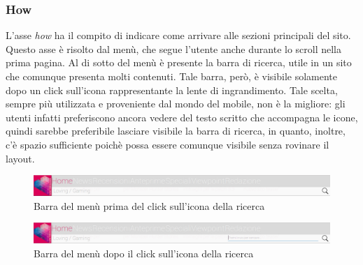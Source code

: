 \documentclass[../ProgettoTecWeb2.tex]{subfiles}
\begin{document}
		\subsubsection{How}
			L'asse \textit{how} ha il compito di indicare come arrivare alle sezioni principali del sito. Questo asse è risolto dal menù, che segue l'utente anche durante lo scroll nella prima pagina. Al di sotto del menù è presente la barra di ricerca, utile in un sito che comunque presenta molti contenuti. Tale barra, però, è visibile solamente dopo un click sull'icona rappresentante la lente di ingrandimento. Tale scelta, sempre più utilizzata e proveniente dal mondo del mobile, non è la migliore: gli utenti infatti preferiscono ancora vedere del testo scritto che accompagna le icone, quindi sarebbe preferibile lasciare visibile la barra di ricerca, in quanto, inoltre, c'è spazio sufficiente poichè possa essere comunque visibile senza rovinare il layout.
			\begin{figure} [H]
				\centering
				\includegraphics[scale=0.3]{img/BarraMenuILoveVg}
				\caption{Barra del menù prima del click sull'icona della ricerca}
			\end{figure}
			\begin{figure} [H]
				\centering
				\includegraphics[scale=0.3]{img/BarraMenuILoveVgDopoClick}
				\caption{Barra del menù dopo il click sull'icona della ricerca}
			\end{figure}
\end{document}
